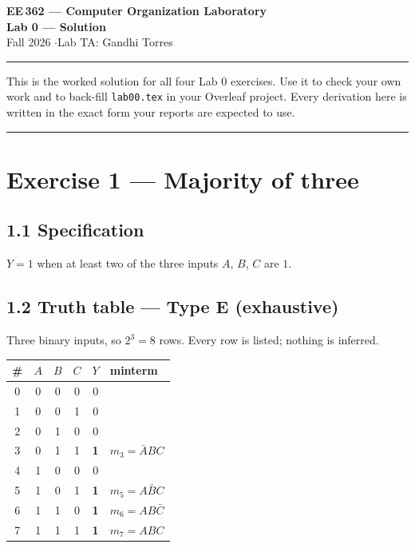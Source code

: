 \documentclass[11pt]{article}
\newcommand{\code}[1]{\texttt{#1}}
\newcommand{\hr}{\vspace{2pt}\hrule\vspace{6pt}}
\begin{document}
\begin{center}
{\Large\bfseries EE\,362 --- Computer Organization Laboratory}\\[2pt]
{\large\bfseries Lab 0 --- Solution}\\[4pt]
Fall 2026 \quad$\cdot$\quad Lab TA: Gandhi Torres
\end{center}
\hr

This is the worked solution for all four Lab 0 exercises. Use it to check your own
work and to back-fill \code{lab00.tex} in your Overleaf project. Every derivation
here is written in the exact form your reports are expected to use.

\vspace{6pt}
\hr

\section*{Exercise 1 --- Majority of three}

\subsection*{1.1 Specification}

$Y = 1$ when at least two of the three inputs $A$, $B$, $C$ are $1$.

\subsection*{1.2 Truth table --- Type E (exhaustive)}

Three binary inputs, so $2^3 = 8$ rows. Every row is listed; nothing is inferred.

\begin{center}
\begin{tabular}{c|ccc|c|l}
\toprule
\# & $A$ & $B$ & $C$ & $Y$ & minterm \\
\midrule
0 & 0 & 0 & 0 & 0 & \\
1 & 0 & 0 & 1 & 0 & \\
2 & 0 & 1 & 0 & 0 & \\
3 & 0 & 1 & 1 & \textbf{1} & $m_3 = \bar{A}BC$ \\
4 & 1 & 0 & 0 & 0 & \\
5 & 1 & 0 & 1 & \textbf{1} & $m_5 = A\bar{B}C$ \\
6 & 1 & 1 & 0 & \textbf{1} & $m_6 = AB\bar{C}$ \\
7 & 1 & 1 & 1 & \textbf{1} & $m_7 = ABC$ \\
\bottomrule
\end{tabular}
\end{center}
\end{document}
